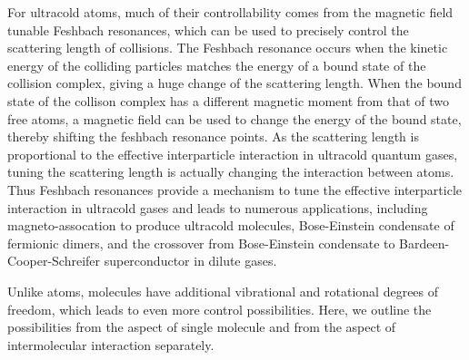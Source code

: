 For ultracold atoms, much of their controllability comes from the magnetic field tunable Feshbach resonances\cite{chin2010}, 
which can be used to precisely control the
scattering length of collisions. The Feshbach resonance occurs when the kinetic energy  of the colliding particles 
matches the energy of a bound state of the collision complex, giving a huge change of the scattering length. When 
the bound state of the collison complex has a different magnetic moment from that of two free atoms, a magnetic 
field can be used to change the energy of the bound state, thereby shifting the feshbach resonance points. As the scattering
length is proportional to the effective interparticle interaction in ultracold quantum gases, tuning the scattering length is
actually changing the interaction between atoms. Thus Feshbach resonances provide a mechanism to tune the effective
interparticle interaction in ultracold gases\cite{chin2010, kohler2006} and leads to numerous applications, including
magneto-assocation to produce ultracold molecules\cite{ni2008, danzl2010}, Bose-Einstein condensate of fermionic dimers\cite{zwierlein2003, regal2004}, and the crossover from Bose-Einstein condensate to Bardeen-Cooper-Schreifer superconductor in dilute gases\cite{chin2004}. 


Unlike atoms, molecules have additional vibrational and rotational degrees of freedom, which leads to even more 
control possibilities. Here, we outline the possibilities from the aspect of single molecule and from
the aspect of intermolecular interaction separately. 


